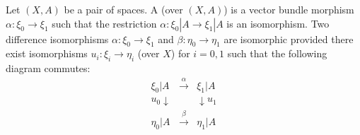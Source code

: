 Let $(X, A)$ be a pair of spaces. A  (over $(X, A)$) is a vector bundle morphism $\alpha: \xi_0 \rightarrow \xi_1$ such that the restriction $\alpha: \xi_0|A \rightarrow \xi_1|A$ is an isomorphism. Two difference isomorphisms $\alpha: \xi_0 \rightarrow \xi_1$ and $\beta: \eta_0 \rightarrow \eta_1$ are isomorphic provided there exist isomorphisms $u_i: \xi_i \rightarrow \eta_i$ (over $X$) for $i = 0, 1$ such that the following diagram commutes:
$$\begin{array}{ccc}
\xi_0|A & \xrightarrow{\alpha} & \xi_1|A \\
u_0 \downarrow & & \downarrow u_1 \\
\eta_0|A & \xrightarrow{\beta} & \eta_1|A
\end{array}$$
